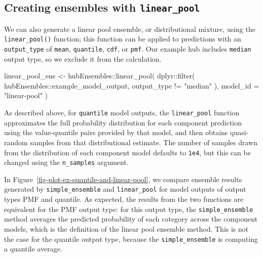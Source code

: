 \documentclass[
]{article}
\newenvironment{Shaded}{\begin{snugshade}}{\end{snugshade}}
\newcommand{\AttributeTok}[1]{\textcolor[rgb]{0.40,0.45,0.13}{#1}}
\newcommand{\FunctionTok}[1]{\textcolor[rgb]{0.28,0.35,0.67}{#1}}
\newcommand{\NormalTok}[1]{\textcolor[rgb]{0.00,0.23,0.31}{#1}}
\newcommand{\OtherTok}[1]{\textcolor[rgb]{0.00,0.23,0.31}{#1}}
\newcommand{\SpecialCharTok}[1]{\textcolor[rgb]{0.37,0.37,0.37}{#1}}
\newcommand{\StringTok}[1]{\textcolor[rgb]{0.13,0.47,0.30}{#1}}
\begin{document}
\subsection{\texorpdfstring{Creating ensembles with
\texttt{linear\_pool}}{Creating ensembles with linear\_pool}}\label{creating-ensembles-with-linear_pool}

We can also generate a linear pool ensemble, or distributional mixture,
using the \texttt{linear\_pool()} function; this function can be applied
to predictions with an \texttt{output\_type} of \texttt{mean},
\texttt{quantile}, \texttt{cdf}, or \texttt{pmf}. Our example hub
includes \texttt{median} output type, so we exclude it from the
calculation.

\begin{Shaded}
\begin{Highlighting}[]
\NormalTok{linear\_pool\_ens }\OtherTok{\textless{}{-}}
\NormalTok{  hubEnsembles}\SpecialCharTok{::}\FunctionTok{linear\_pool}\NormalTok{(}
\NormalTok{    dplyr}\SpecialCharTok{::}\FunctionTok{filter}\NormalTok{(}
\NormalTok{      hubEnsembles}\SpecialCharTok{::}\NormalTok{example\_model\_output,}
\NormalTok{      output\_type }\SpecialCharTok{!=} \StringTok{"median"}
\NormalTok{    ),}
    \AttributeTok{model\_id =} \StringTok{"linear{-}pool"}
\NormalTok{  )}
\end{Highlighting}
\end{Shaded}

As described above, for \texttt{quantile} model outputs, the
\texttt{linear\_pool} function approximates the full probability
distribution for each component prediction using the value-quantile
pairs provided by that model, and then obtains quasi-random samples from
that distributional estimate. The number of samples drawn from the
distribution of each component model defaults to \texttt{1e4}, but this
can be changed using the \texttt{n\_samples} argument.

In Figure~\ref{fig-plot-ex-quantile-and-linear-pool}, we compare
ensemble results generated by \texttt{simple\_ensemble} and
\texttt{linear\_pool} for model outputs of output types PMF and
quantile. As expected, the results from the two functions are equivalent
for the PMF output type: for this output type, the
\texttt{simple\_ensemble} method averages the predicted probability of
each category across the component models, which is the definition of
the linear pool ensemble method. This is not the case for the quantile
output type, because the \texttt{simple\_ensemble} is computing a
quantile average.
\end{document}
